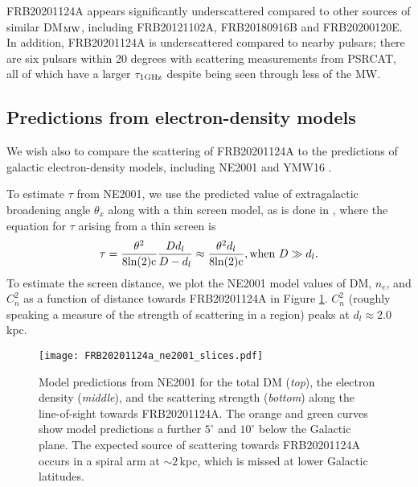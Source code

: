 \documentclass[fleqn,usenatbib]{mnras}
\newcommand{\frb}{FRB20201124A}
\newcommand{\rGC}{FRB20200120E}
\newcommand{\rthree}{FRB20180916B}
\newcommand{\rone}{FRB20121102A}
\begin{document}
{\frb} appears significantly underscattered compared to other sources of similar 
DM$_{\rm MW}$, including {\rone}, {\rthree} and {\rGC}.  In addition, {\frb} is underscattered 
compared to nearby pulsars; there are six pulsars within 20 degrees with scattering 
measurements from PSRCAT, all of which have a larger $\tau_{1 \rm GHz}$ despite being seen 
through less of the MW.

\subsection{Predictions from electron-density models}
\label{sec:NE2001}
We wish also to compare the scattering of {\frb} to the predictions of galactic electron-density models, including NE2001 \citep{cordes+02} and YMW16 \citep{yao+17}.


To estimate $\tau$ from NE2001, we use the predicted value of extragalactic broadening angle $\theta_{x}$ along with a thin screen model, as is done in \citet{ocker+21}, where the equation for $\tau$ arising from a thin screen is
\begin{equation}
\tau = \frac{\theta^{2}}{8\rm{ln(2)}c} \frac{D d_{l}}{D - d_{l}} \approx \frac{\theta^{2} d_{l}}{8\rm{ln(2)}c}, \text{when }D \gg d_{l}.
\end{equation}
 To estimate the screen distance, we plot the NE2001 model values of DM, $n_{e}$, and $C_{n}^{2}$ as a function of distance towards {\frb} in Figure \ref{fig:NE2001}.  $C_{n}^{2}$ (roughly speaking a measure of the strength of scattering in a region) peaks at $d_{l} \approx 2.0$\,kpc. %

\begin{figure}
    \centering
    \texttt{[image: FRB20201124a\_ne2001\_slices.pdf]} \\
    \vspace{-3mm}
    \caption{ Model predictions from NE2001 for the total DM (\textit{top}), the electron density (\textit{middle}), and the scattering strength (\textit{bottom}) along the line-of-sight towards {\frb}. The orange and green curves show model predictions a further $5^{\circ}$ and $10^{\circ}$ below the Galactic plane. The expected source of scattering towards \frb{} occurs in a spiral arm at $\sim 2\,$kpc, which is missed at lower Galactic latitudes.} 
    \label{fig:NE2001}
\end{figure}
\end{document}

